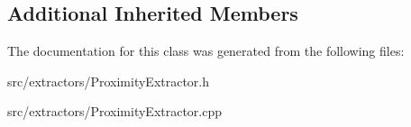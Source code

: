 \subsection*{Additional Inherited Members}


The documentation for this class was generated from the following files\+:\begin{DoxyCompactItemize}
\item 
src/extractors/Proximity\+Extractor.\+h\item 
src/extractors/Proximity\+Extractor.\+cpp\end{DoxyCompactItemize}
